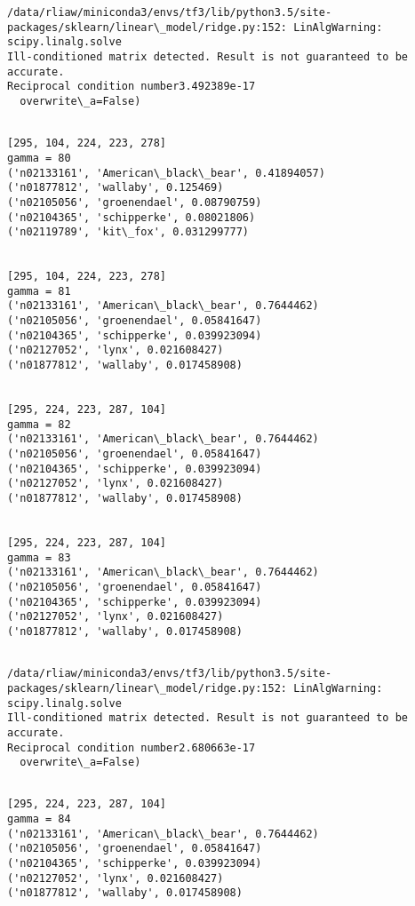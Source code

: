 \documentclass[11pt]{article}
\begin{document}
    \begin{Verbatim}[commandchars=\\\{\}]
/data/rliaw/miniconda3/envs/tf3/lib/python3.5/site-packages/sklearn/linear\_model/ridge.py:152: LinAlgWarning: scipy.linalg.solve
Ill-conditioned matrix detected. Result is not guaranteed to be accurate.
Reciprocal condition number3.492389e-17
  overwrite\_a=False)

    \end{Verbatim}

    \begin{Verbatim}[commandchars=\\\{\}]

[295, 104, 224, 223, 278]
gamma = 80
('n02133161', 'American\_black\_bear', 0.41894057)
('n01877812', 'wallaby', 0.125469)
('n02105056', 'groenendael', 0.08790759)
('n02104365', 'schipperke', 0.08021806)
('n02119789', 'kit\_fox', 0.031299777)


[295, 104, 224, 223, 278]
gamma = 81
('n02133161', 'American\_black\_bear', 0.7644462)
('n02105056', 'groenendael', 0.05841647)
('n02104365', 'schipperke', 0.039923094)
('n02127052', 'lynx', 0.021608427)
('n01877812', 'wallaby', 0.017458908)


[295, 224, 223, 287, 104]
gamma = 82
('n02133161', 'American\_black\_bear', 0.7644462)
('n02105056', 'groenendael', 0.05841647)
('n02104365', 'schipperke', 0.039923094)
('n02127052', 'lynx', 0.021608427)
('n01877812', 'wallaby', 0.017458908)


[295, 224, 223, 287, 104]
gamma = 83
('n02133161', 'American\_black\_bear', 0.7644462)
('n02105056', 'groenendael', 0.05841647)
('n02104365', 'schipperke', 0.039923094)
('n02127052', 'lynx', 0.021608427)
('n01877812', 'wallaby', 0.017458908)


    \end{Verbatim}

    \begin{Verbatim}[commandchars=\\\{\}]
/data/rliaw/miniconda3/envs/tf3/lib/python3.5/site-packages/sklearn/linear\_model/ridge.py:152: LinAlgWarning: scipy.linalg.solve
Ill-conditioned matrix detected. Result is not guaranteed to be accurate.
Reciprocal condition number2.680663e-17
  overwrite\_a=False)

    \end{Verbatim}

    \begin{Verbatim}[commandchars=\\\{\}]

[295, 224, 223, 287, 104]
gamma = 84
('n02133161', 'American\_black\_bear', 0.7644462)
('n02105056', 'groenendael', 0.05841647)
('n02104365', 'schipperke', 0.039923094)
('n02127052', 'lynx', 0.021608427)
('n01877812', 'wallaby', 0.017458908)


    \end{Verbatim}
\end{document}

